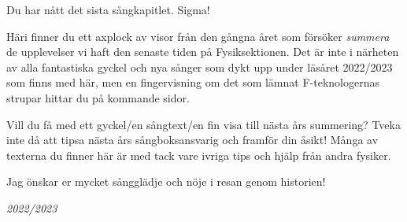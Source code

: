 \documentclass[a6paper, 10pt, twoside]{article}
\begin{document}
\noindent
{}
\small
\vspace{10pt}

\noindent
\small
Du har nått det sista sångkapitlet. Sigma! 

Häri finner du ett axplock av visor från den gångna året som försöker
{\it summera} de upplevelser vi haft den senaste tiden på Fysiksektionen.
Det är inte i närheten av alla fantastiska gyckel och nya sånger som dykt
upp under läsåret 2022/2023 som finns med här, men en fingervisning om
det som lämnat F-teknologernas strupar hittar du på kommande sidor. 

Vill du få med ett gyckel/en sångtext/en fin visa till nästa års summering?
Tveka inte då att tipsa nästa års sångboksansvarig och framför din åsikt!
Många av texterna du finner här är med tack vare ivriga tips och hjälp från andra fysiker.

Jag önskar er mycket sångglädje och nöje i resan genom historien!


\begin{center}
\huge{\textit{2022/2023}}
\end{center}
\end{document}
